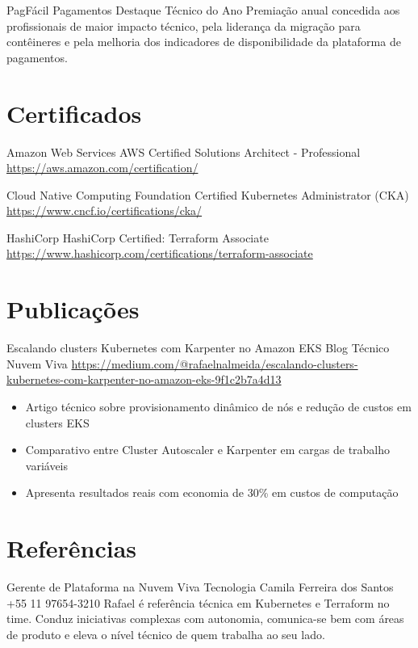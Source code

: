 \documentclass[a4paper, serif, 10pt]{moderncv}
\begin{document}
        {PagFácil Pagamentos}
        {Destaque Técnico do Ano}
        {}
        {}
        {Premiação anual concedida aos profissionais de maior impacto técnico, pela liderança da migração para contêineres e pela melhoria dos indicadores de disponibilidade da plataforma de pagamentos.}
\section{Certificados}

        {Amazon Web Services}
        {AWS Certified Solutions Architect - Professional}
        {\url{https://aws.amazon.com/certification/}}
        {}
        {}

        {Cloud Native Computing Foundation}
        {Certified Kubernetes Administrator (CKA)}
        {\url{https://www.cncf.io/certifications/cka/}}
        {}
        {}

        {HashiCorp}
        {HashiCorp Certified: Terraform Associate}
        {\url{https://www.hashicorp.com/certifications/terraform-associate}}
        {}
        {}
\section{Publicações}

        {Escalando clusters Kubernetes com Karpenter no Amazon EKS}
        {Blog Técnico Nuvem Viva}
        {\url{https://medium.com/@rafaelnalmeida/escalando-clusters-kubernetes-com-karpenter-no-amazon-eks-9f1c2b7a4d13}}
        {}
        {\begin{itemize}
\item Artigo técnico sobre provisionamento dinâmico de nós e redução de custos em clusters EKS
\item Comparativo entre Cluster Autoscaler e Karpenter em cargas de trabalho variáveis
\item Apresenta resultados reais com economia de 30\% em custos de computação
\end{itemize}}
\section{Referências}

        {Gerente de Plataforma na Nuvem Viva Tecnologia}
        {Camila Ferreira dos Santos}
        {+55 11 97654-3210}
        {}
        {Rafael é referência técnica em Kubernetes e Terraform no time. Conduz iniciativas complexas com autonomia, comunica-se bem com áreas de produto e eleva o nível técnico de quem trabalha ao seu lado.}
\end{document}
